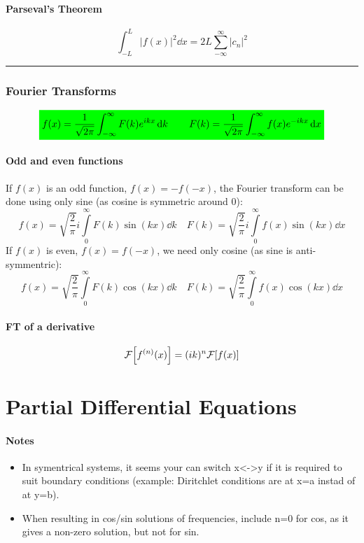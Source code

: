 \documentclass[10pt,a4paper]{article}
\renewcommand{\exp}{e^}
\newcommand{\infint}{\int_{-\infty}^{\infty}}
\newcommand{\holine}{\rule{286pt}{1pt}}
\newcommand{\gr}[1]{\colorbox{green}{$\displaystyle #1$}}
\begin{document}
\begin{multicols}{2}
\subsection*{Parseval's Theorem}
\[
    \int_{-L}^L |f(x)|^2 \dd{x} = 2L\sum_{-\infty}^\infty |c_n|^2
\]



\holine
\section*{Fourier Transforms}
\[\gr{
    f(x) = \frac{1}{\sqrt{2\pi}} \infint F(k) \exp{ikx} \dd{k} \quad\quad
    F(k) = \frac{1}{\sqrt{2\pi}} \infint f(x) \exp{-ikx} \dd{x}
}\]

\subsection*{Odd and even functions}
If $f(x)$ is an odd function, $f(x) = -f(-x)$, the Fourier transform can be done using only sine (as cosine is symmetric around 0):
\[
    f(x) = \sqrt{\frac{2}{\pi}} i\int\limits_0^{\infty} F(k) \sin(k x) \dd{k}   \quad
    F(k) = \sqrt{\frac{2}{\pi}} i\int\limits_0^{\infty} f(x) \sin(k x) \dd{x}
\]
If $f(x)$ is even, $f(x) = f(-x)$, we need only cosine (as sine is anti-symmentric):
\[
    f(x) = \sqrt{\frac{2}{\pi}} \int\limits_0^{\infty} F(k) \cos(k x) \dd{k}   \quad
    F(k) = \sqrt{\frac{2}{\pi}} \int\limits_0^{\infty} f(x) \cos(k x) \dd{x}
\]


\subsection*{FT of a derivative}
\[
    \mathcal{F}\qty[f^{(n)}(x)] = (ik)^n \mathcal{F}\qty[f(x)]
\]


    




\newpage
\part*{Partial Differential Equations}
\subsection*{Notes}
\begin{itemize}
    \item In symentrical systems, it seems your can switch x<->y if it is required to suit boundary conditions (example: Diritchlet conditions are at x=a instad of at y=b).
    \item When resulting in cos/sin solutions of frequencies, include n=0 for cos, as it gives a non-zero solution, but not for sin.
\end{itemize}


\end{multicols}
\end{document}
